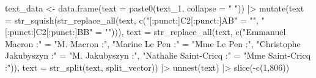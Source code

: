 \documentclass[
  letterpaper,
  DIV=11,
  numbers=noendperiod]{scrartcl}
\newenvironment{Shaded}{\begin{snugshade}}{\end{snugshade}}
\newcommand{\AttributeTok}[1]{\textcolor[rgb]{0.40,0.45,0.13}{#1}}
\newcommand{\DecValTok}[1]{\textcolor[rgb]{0.68,0.00,0.00}{#1}}
\newcommand{\FunctionTok}[1]{\textcolor[rgb]{0.28,0.35,0.67}{#1}}
\newcommand{\NormalTok}[1]{\textcolor[rgb]{0.00,0.23,0.31}{#1}}
\newcommand{\OtherTok}[1]{\textcolor[rgb]{0.00,0.23,0.31}{#1}}
\newcommand{\SpecialCharTok}[1]{\textcolor[rgb]{0.37,0.37,0.37}{#1}}
\newcommand{\StringTok}[1]{\textcolor[rgb]{0.13,0.47,0.30}{#1}}
\begin{document}
\begin{Shaded}
\begin{Highlighting}[]
\NormalTok{text\_data }\OtherTok{\textless{}{-}} \FunctionTok{data.frame}\NormalTok{(}\AttributeTok{text =} \FunctionTok{paste0}\NormalTok{(text\_1, }\AttributeTok{collapse =} \StringTok{" "}\NormalTok{)) }\SpecialCharTok{|\textgreater{}} 
    \FunctionTok{mutate}\NormalTok{(}\AttributeTok{text =} \FunctionTok{str\_squish}\NormalTok{(}\FunctionTok{str\_replace\_all}\NormalTok{(text, }\FunctionTok{c}\NormalTok{(}\StringTok{"[:punct:]C2[:punct:]AB"}  \OtherTok{=} \StringTok{""}\NormalTok{,}
                                                     \StringTok{"[:punct:]C2[:punct:]BB"}  \OtherTok{=} \StringTok{""}\NormalTok{))),}
           \AttributeTok{text =} \FunctionTok{str\_replace\_all}\NormalTok{(text, }\FunctionTok{c}\NormalTok{(}\StringTok{"Emmanuel Macron :"}       \OtherTok{=} \StringTok{"M. Macron :"}\NormalTok{,}
                                          \StringTok{"Marine Le Pen :"}         \OtherTok{=} \StringTok{"Mme Le Pen :"}\NormalTok{,}
                                          \StringTok{"Christophe Jakubyszyn :"} \OtherTok{=} \StringTok{"M. Jakubyszyn :"}\NormalTok{,}
                                          \StringTok{"Nathalie Saint{-}Cricq :"}  \OtherTok{=} \StringTok{"Mme Saint{-}Cricq :"}\NormalTok{)),}
           \AttributeTok{text =} \FunctionTok{str\_split}\NormalTok{(text, split\_vector)) }\SpecialCharTok{|\textgreater{}}
  \FunctionTok{unnest}\NormalTok{(text) }\SpecialCharTok{|\textgreater{}} 
  \FunctionTok{slice}\NormalTok{(}\SpecialCharTok{{-}}\FunctionTok{c}\NormalTok{(}\DecValTok{1}\NormalTok{,}\DecValTok{806}\NormalTok{))}


\end{Highlighting}
\end{Shaded}
\end{document}
